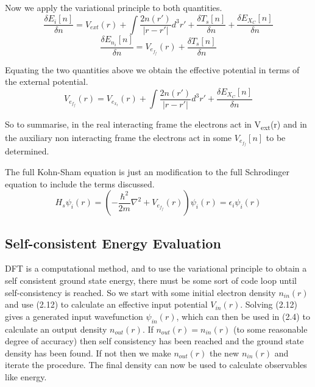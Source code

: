\documentclass[12pt]{article}
\begin{document}
Now we apply the variational principle to both quantities. 
\begin{equation} \label{2.10} \tag{2.11}
\frac{\delta E_i[n]}{\delta n} = V_{ext}(r) + \int \frac{2n(r')}{|r-r'|}d^3r'  +\frac{\delta T_s[n]}{\delta n} + \frac{\delta E_X_C[n]}{\delta n}
\end{equation}
\begin{equation} \label{2.11} \tag{2.12}
\frac{\delta E_n_i[n]}{\delta n}= V_e_f_f(r) + \frac{\delta T_s[n]}{\delta n}
\end{equation}

Equating the two quantities above we obtain the effective potential in terms of the external potential.
\begin{equation} \label{2.12} \tag{2.13}
V_e_f_f(r)=V_e_x_t(r)  +\int \frac{2n(r')}{|r-r'|}d^3r' + \frac{\delta E_X_C[n]}{\delta n}
\end{equation}

So to summarise, in the real interacting frame the electrons act in  V\textsubscript{ext}(r) and in the auxiliary non interacting frame the electrons act in some $V_e_f_f[n]$ to be determined.

The full Kohn-Sham equation is just an modification to the full Schrodinger equation to include the terms discussed.
\begin{equation} \label{2.12} \tag{2.14}
H_s \psi_i (r) = (-\frac{\hbar^2}{2m}\nabla^2 +V_e_f_f(r) ) \psi_i (r) = \epsilon_i \psi_i (r)
\end{equation}

\subsection{Self-consistent Energy Evaluation}

DFT is a computational method, and to use the variational principle to obtain a self consistent ground state energy, there must be some sort of code loop until self-consistency is reached. So we start with some initial electron density $n_{in}(r)$ and use (2.12) to calculate an effective input potential $V_{in}(r)$. Solving (2.12) gives a generated input wavefunction $\psi_{in}(r)$, which can then be used in (2.4) to calculate an output density $n_{out}(r)$. If $n_{out}(r)=n_{in}(r)$ (to some reasonable degree of accuracy) then self consistency has been reached and the ground state density has been found. If not then we make $n_{out}(r)$ the new $n_{in}(r)$ and iterate the procedure. The final density can now be used to calculate observables like energy.
\end{document}
